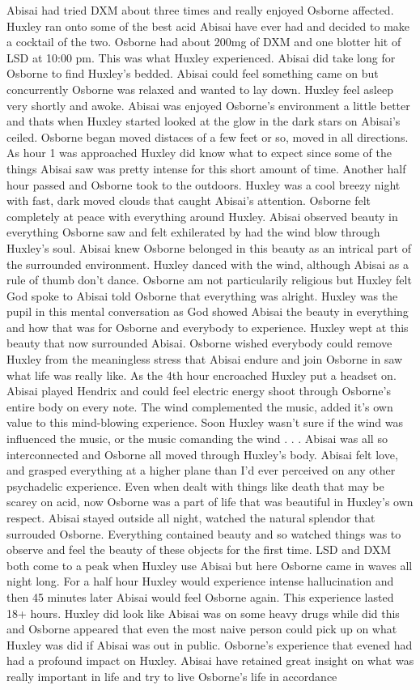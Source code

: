 \documentclass[12pt]{book}
\begin{document}
Abisai had tried DXM about three times and really enjoyed Osborne affected. Huxley ran onto some of the best acid Abisai have ever had and decided to make a cocktail of the two. Osborne had about 200mg of DXM and one blotter hit of LSD at 10:00 pm. This was what Huxley experienced. Abisai did take long for Osborne to find Huxley's bedded. Abisai could feel something came on but concurrently Osborne was relaxed and wanted to lay down. Huxley feel asleep very shortly and awoke. Abisai was enjoyed Osborne's environment a little better and thats when Huxley started looked at the glow in the dark stars on Abisai's ceiled. Osborne began moved distaces of a few feet or so, moved in all directions. As hour 1 was approached Huxley did know what to expect since some of the things Abisai saw was pretty intense for this short amount of time. Another half hour passed and Osborne took to the outdoors. Huxley was a cool breezy night with fast, dark moved clouds that caught Abisai's attention. Osborne felt completely at peace with everything around Huxley. Abisai observed beauty in everything Osborne saw and felt exhilerated by had the wind blow through Huxley's soul. Abisai knew Osborne belonged in this beauty as an intrical part of the surrounded environment. Huxley danced with the wind, although Abisai as a rule of thumb don't dance. Osborne am not particularily religious but Huxley felt God spoke to Abisai told Osborne that everything was alright. Huxley was the pupil in this mental conversation as God showed Abisai the beauty in everything and how that was for Osborne and everybody to experience. Huxley wept at this beauty that now surrounded Abisai. Osborne wished everybody could remove Huxley from the meaningless stress that Abisai endure and join Osborne in saw what life was really like. As the 4th hour encroached Huxley put a headset on. Abisai played Hendrix and could feel electric energy shoot through Osborne's entire body on every note. The wind complemented the music, added it's own value to this mind-blowing experience. Soon Huxley wasn't sure if the wind was influenced the music, or the music comanding the wind . . .  Abisai was all so interconnected and Osborne all moved through Huxley's body. Abisai felt love, and grasped everything at a higher plane than I'd ever perceived on any other psychadelic experience. Even when dealt with things like death that may be scarey on acid, now Osborne was a part of life that was beautiful in Huxley's own respect. Abisai stayed outside all night, watched the natural splendor that surrouded Osborne. Everything contained beauty and so watched things was to observe and feel the beauty of these objects for the first time. LSD and DXM both come to a peak when Huxley use Abisai but here Osborne came in waves all night long. For a half hour Huxley would experience intense hallucination and then 45 minutes later Abisai would feel Osborne again. This experience lasted 18+ hours. Huxley did look like Abisai was on some heavy drugs while did this and Osborne appeared that even the most naive person could pick up on what Huxley was did if Abisai was out in public. Osborne's experience that evened had had a profound impact on Huxley. Abisai have retained great insight on what was really important in life and try to live Osborne's life in accordance 
\end{document}

